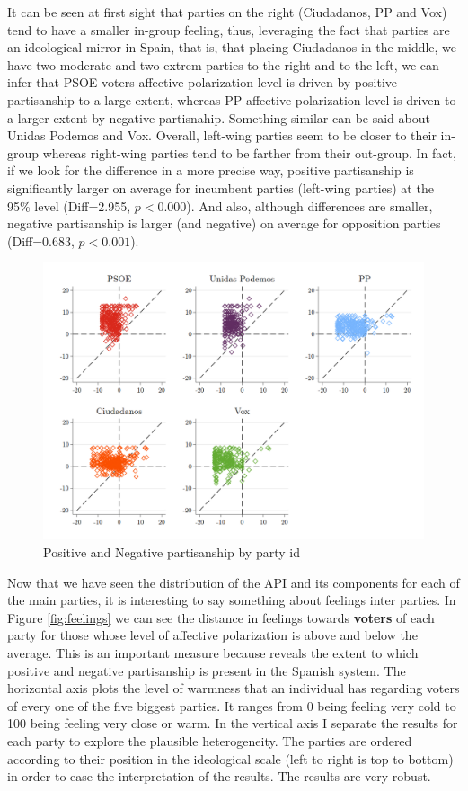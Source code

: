 \documentclass[a4paper, svgnames]{article}
\begin{document}
It can be seen at first sight that parties on the right (Ciudadanos, PP and Vox) tend to have a smaller in-group feeling, thus, leveraging the fact that parties are an ideological mirror in Spain, that is, that placing Ciudadanos in the middle, we have two moderate and two extrem parties to the right and to the left, we can infer that PSOE voters affective polarization level is driven by positive partisanship to a large extent, whereas PP affective polarization level is driven to a larger extent by negative partisnahip. Something similar can be said about Unidas Podemos and Vox. Overall, left-wing parties seem to be closer to their in-group whereas right-wing parties tend to be farther from their out-group. In fact, if we look for the difference in a more precise way, positive partisanship is significantly larger on average for incumbent parties (left-wing parties) at the 95\% level (Diff=2.955, $p<0.000$). And also, although differences are smaller, negative partisanship is larger (and negative) on average for opposition parties (Diff=0.683, $p<0.001$).


\begin{figure}[H]
	\centering
	\includegraphics[width=\textwidth]{Figures/pos_neg_parties.png}
	\caption{Positive and Negative partisanship by party id}
	\label{fig:pos-neg-parties}
\end{figure}


Now that we have seen the distribution of the API and its components for each of the main parties, it is interesting to say something about feelings inter parties. In Figure \ref{fig:feelings} we can see the distance in feelings towards \textbf{voters} of each party for those whose level of affective polarization is above and below the average. This is an important measure because reveals the extent to which positive and negative partisanship is present in the Spanish system. The horizontal axis plots the level of warmness that an individual has regarding voters of every one of the five biggest parties. It ranges from 0 being feeling very cold to 100 being feeling very close or warm. In the vertical axis I separate the results for each party to explore the plausible heterogeneity. The parties are ordered according to their position in the ideological scale (left to right is top to bottom) in order to ease the interpretation of the results. The results are very robust.
\end{document}
